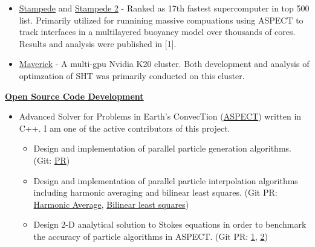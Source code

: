 \documentclass[11pt]{ltxdoc}
\begin{document}
\begin{description}
\begin{itemize}
      \begin{itemize}
      	
        \item \href{https://portal.xsede.org/tacc-stampede}{Stampede} and \href{https://portal.xsede.org/tacc-stampede2}{Stampede 2} - Ranked as 17th fastest supercomputer in top 500 list. Primarily utilized for runnining massive compuations using ASPECT to track interfaces in a multilayered buoyancy model over thousands of cores. Results and analysis were published in [1].
        
        \item \href{https://portal.xsede.org/tacc-maverick}{Maverick} - A multi-gpu Nvidia K20 cluster. Both development and analysis of optimzation of SHT was primarily conducted on this cluster. 
        
      \end{itemize}
     \end{itemize}
    
    \item[] \textbf{\underline{Open Source Code Development}}
    
      \begin{itemize}
      	
        \item Advanced Solver for Problems in Earth's ConvecTion (\href{https://github.com/geodynamics/aspect}{ASPECT}) written in C++. I am one of the active contributors of this project.
        
            \begin{itemize}        
            
            \item Design and implementation of parallel particle generation algorithms. (Git: \href{https://github.com/geodynamics/aspect/pull/1266}{PR})
           
            \item Design and implementation of parallel particle interpolation algorithms including harmonic averaging and bilinear least squares. (Git PR: \href{https://github.com/geodynamics/aspect/pull/1949}{Harmonic Average}, \href{https://github.com/geodynamics/aspect/pull/1554}{Bilinear least squares})
           
            \item Design 2-D analytical solution to Stokes equations in order to benchmark the accuracy of particle algorithms in ASPECT. (Git PR: \href{https://github.com/EGP-CIG-REU/aspect/tree/EGP_HVL_benchmark/benchmark/egp_hvl}{1}, \href{https://github.com/EGP-CIG-REU/aspect/tree/simple_annulus_benchmark/benchmarks/simple_annulus}{2})
                       

\end{itemize}
\end{itemize}
\end{description}
\end{document}
